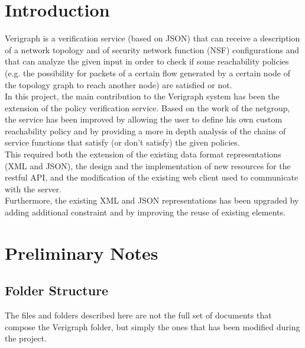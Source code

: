 \section {Introduction}

Verigraph is a verification service (based on JSON) that can receive a description of a network topology and of security network function (NSF) configurations and that can analyze the given input in order to check if some reachability policies (e.g. the possibility for packets of a certain flow generated by a certain node of the topology graph to reach another node) are satisfied or not. \\
\newline
In this project, the main contribution to the Verigraph system has been the extension of the policy verification service. Based on the work of the netgroup, the service has been improved by allowing the user to define his own custom reachability policy and by providing a more in depth analysis of the chains of service functions that satisfy (or don't satisfy) the given policies.
\\
This required both the extension of the existing data format representations (XML and JSON), the design and the implementation of new resources for the restful API, and the modification of the existing web client used to communicate with the server. \\
Furthermore, the existing XML and JSON representations has been upgraded by adding additional constraint and by improving the reuse of existing elements.

\section {Preliminary Notes}

\subsection {Folder Structure}

The files and folders described here are not the full set of documents that compose the Verigraph folder, but simply the ones that has been modified during the project. 

